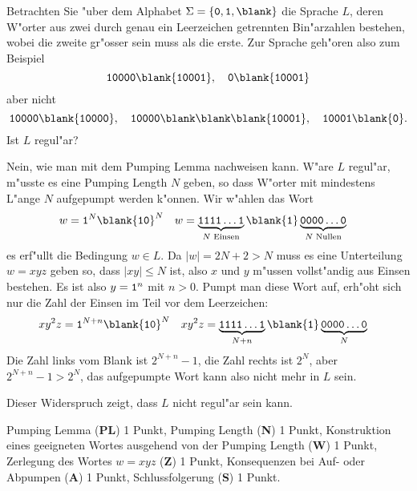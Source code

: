 Betrachten Sie "uber dem Alphabet $\Sigma = \{{\tt 0},{\tt 1},\blank\}$ die
Sprache $L$, deren W"orter aus zwei durch genau ein Leerzeichen getrennten
Bin"arzahlen bestehen, wobei die zweite gr"osser sein muss als die erste.
Zur Sprache geh"oren also zum Beispiel
\[
{\tt 10000}\blank{\tt 10001},\quad
{\tt 0}\blank{\tt 10001}
\]
aber nicht
\[
{\tt 10000}\blank{\tt 10000},\quad
{\tt 10000}\blank\blank\blank{\tt 10001},\quad
{\tt 10001}\blank{\tt 0}.
\]
Ist $L$ regul"ar?

\begin{loesung}
Nein, wie man mit dem Pumping Lemma nachweisen kann.
W"are $L$ regul"ar, m"usste es eine Pumping Length $N$ geben, so dass
W"orter mit mindestens L"ange $N$ aufgepumpt werden k"onnen. Wir w"ahlen
das Wort
\begin{align*}
w&= {\tt 1}^N\blank{\tt 10}^N
&
w&=\underbrace{\tt 1111\dots 1}_{\text{$N$ Einsen}}\blank{\tt 1}\underbrace{\tt 0000\dots 0}_{\text{$N$ Nullen}}
\end{align*}
es erf"ullt die Bedingung $w\in L$. Da $|w| = 2N+2>N$ muss es eine
Unterteilung $w=xyz$ geben so, dass $|xy|\le N$ ist, also $x$ und $y$
m"ussen vollst"andig aus Einsen bestehen. Es ist also $y={\tt 1}^n$
mit $n > 0$.
Pumpt man diese Wort auf, erh"oht sich nur die Zahl der Einsen im Teil
vor dem Leerzeichen:
\begin{align*}
xy^2z&={\tt 1}^{N+n}\blank{\tt 10}^N
&
xy^2z&=
\underbrace{\tt 1111\dots 1}_{N+n}\blank{\tt 1}\underbrace{\tt 0000\dots 0}_{N}
\end{align*}
Die Zahl links vom Blank ist $2^{N+n}-1$, die Zahl rechts ist $2^N$,
aber $2^{N+n}-1 > 2^N$, das aufgepumpte Wort kann also nicht mehr
in $L$ sein.

Dieser Widerspruch zeigt, dass $L$ nicht regul"ar sein kann.
\end{loesung}

\begin{bewertung}
Pumping Lemma ({\bf PL}) 1 Punkt,
Pumping Length ({\bf N}) 1 Punkt,
Konstruktion eines geeigneten Wortes ausgehend von der Pumping Length
({\bf W}) 1 Punkt,
Zerlegung des Wortes $w=xyz$ ({\bf Z}) 1 Punkt,
Konsequenzen bei Auf- oder Abpumpen ({\bf A}) 1 Punkt,
Schlussfolgerung ({\bf S}) 1 Punkt.
\end{bewertung}


